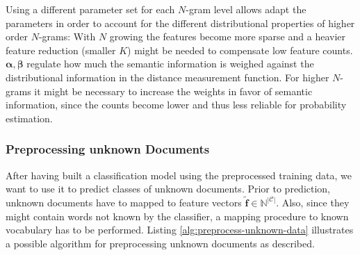 Using a different parameter set for each $N$-gram level allows adapt the
parameters in order to account for the different distributional properties of
higher order $N$-grams: With $N$ growing the features become more sparse and a
heavier feature reduction (smaller $K$) might be needed to compensate low
feature counts.
$\boldsymbol \alpha, \boldsymbol \beta$ regulate how much the semantic information is weighed against the distributional information in
the distance measurement function. For higher $N$-grams it might be necessary to
increase the weights in favor of semantic information, since the counts become 
lower and thus less reliable for probability estimation. 

\subsubsection{Preprocessing unknown Documents}

After having built a classification model using the preprocessed training data,
we want to use it to predict classes of unknown documents. Prior to prediction,
unknown documents have to mapped to feature vectors $\mathbf{\tilde{f}} \in
\mathbb{N}^{|\mathcal{C}|}$. Also, since they might contain words not known by
the classifier, a mapping procedure to known vocabulary has to be performed. Listing
\ref{alg:preprocess-unknown-data} illustrates a possible algorithm for
preprocessing unknown documents as described.

